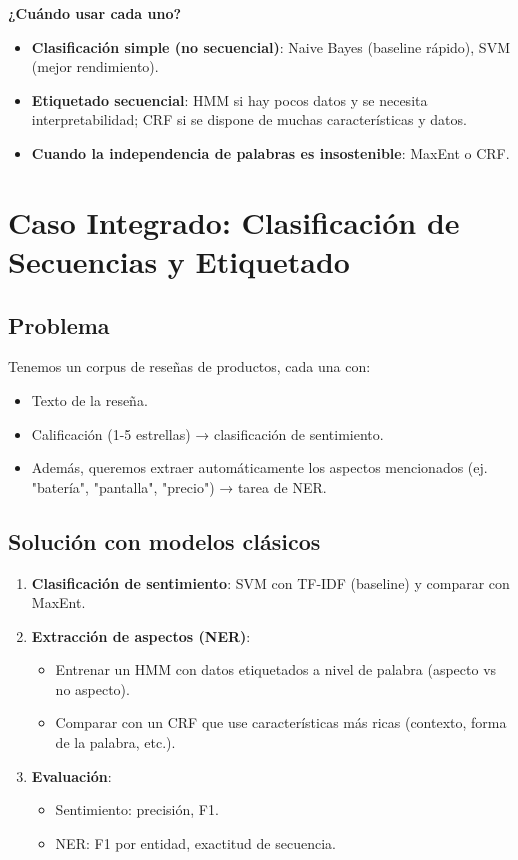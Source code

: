 \documentclass[12pt,a4paper,openany,oneside]{book}
\begin{document}
\textbf{¿Cuándo usar cada uno?}
\begin{itemize}
    \item \textbf{Clasificación simple (no secuencial)}: Naive Bayes (baseline rápido), SVM (mejor rendimiento).
    \item \textbf{Etiquetado secuencial}: HMM si hay pocos datos y se necesita interpretabilidad; CRF si se dispone de muchas características y datos.
    \item \textbf{Cuando la independencia de palabras es insostenible}: MaxEnt o CRF.
\end{itemize}

\section{Caso Integrado: Clasificación de Secuencias y Etiquetado}

\subsection{Problema}
Tenemos un corpus de reseñas de productos, cada una con:
\begin{itemize}
    \item Texto de la reseña.
    \item Calificación (1-5 estrellas) → clasificación de sentimiento.
    \item Además, queremos extraer automáticamente los aspectos mencionados (ej. "batería", "pantalla", "precio") → tarea de NER.
\end{itemize}

\subsection{Solución con modelos clásicos}
\begin{enumerate}
    \item \textbf{Clasificación de sentimiento}: SVM con TF-IDF (baseline) y comparar con MaxEnt.
    \item \textbf{Extracción de aspectos (NER)}:
    \begin{itemize}
        \item Entrenar un HMM con datos etiquetados a nivel de palabra (aspecto vs no aspecto).
        \item Comparar con un CRF que use características más ricas (contexto, forma de la palabra, etc.).
    \end{itemize}
    \item \textbf{Evaluación}:
    \begin{itemize}
        \item Sentimiento: precisión, F1.
        \item NER: F1 por entidad, exactitud de secuencia.
    \end{itemize}
\end{enumerate}
\end{document}
